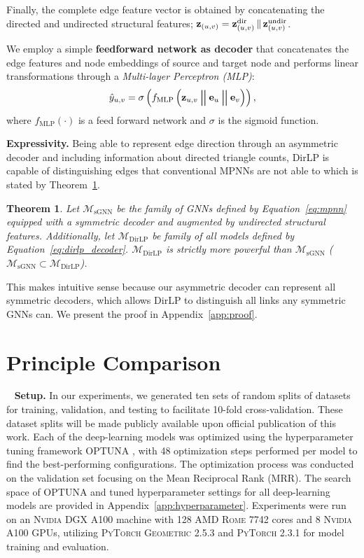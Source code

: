 \documentclass{article}
\newtheorem{theorem}{Theorem}
\DeclareMathOperator*{\concat}{\scalerel*{\Vert}{\sum}}
\begin{document}
Finally, the complete edge feature vector is obtained by concatenating the directed and undirected structural features; $\mathbf{z}_{(u, v)} = \mathbf{z}_{(u, v)}^{\operatorname{dir}} \concat \mathbf{z}_{(u, v)}^{\operatorname{undir}}$.
    
We employ a simple \textbf{feedforward network as decoder} that concatenates the edge features and node embeddings of source and target node and performs linear transformations through a \emph{Multi-layer Perceptron (MLP)}:
    \begin{equation}\label{eq:dirlp_decoder}
        \hat{y}_{u, v} = \sigma\left(f_{\operatorname{MLP}} \left(\mathbf{z}_{u, v} \concat \mathbf{e}_{u} \concat \mathbf{e}_{v} \right)\right), 
    \end{equation}
    where $f_{\operatorname{MLP}}(\cdot)$ is a feed forward network and $\sigma$ is the sigmoid function. 

\textbf{Expressivity.} Being able to represent edge direction through an asymmetric decoder and including information about directed triangle counts, DirLP is capable of distinguishing edges that conventional MPNNs are not able to which is stated by Theorem~\ref{thm:dirgnn}.

\begin{theorem}\label{thm:dirgnn}
    Let $\mathcal{M}_{\operatorname{sGNN}}$ be the family of GNNs defined by Equation~\ref{eq:mpnn} equipped with a symmetric decoder and augmented by undirected structural features. Additionally, let $\mathcal{M}_{\operatorname{DirLP}}$ be family of all models defined by Equation~\ref{eq:dirlp_decoder}. $\mathcal{M}_{\operatorname{DirLP}}$ is strictly more powerful than $\mathcal{M}_{\operatorname{sGNN}}$ ($\mathcal{M}_{\operatorname{sGNN}} \subset \mathcal{M}_{\operatorname{DirLP}}$).
\end{theorem}
This makes intuitive sense because our asymmetric decoder can represent all symmetric decoders, which allows DirLP to distinguish all links any symmetric GNNs can. We present the proof in Appendix~\ref{app:proof}.

\section{Principle Comparison}~\label{sec:experiments}
\textbf{Setup.} In our experiments, we generated ten sets of random splits of datasets for training, validation, and testing to facilitate 10-fold cross-validation. These dataset splits will be made publicly available upon official publication of this work. Each of the deep-learning models was optimized using the hyperparameter tuning framework \textsc{OPTUNA} \citep{akiba2019optuna}, with 48 optimization steps performed per model to find the best-performing configurations. The optimization process was conducted on the validation set focusing on the Mean Reciprocal Rank (MRR). The search space of \textsc{OPTUNA} and tuned hyperparameter settings for all deep-learning models are provided in Appendix~\ref{app:hyperparameter}. Experiments were run on an \textsc{Nvidia DGX A100} machine with 128 \textsc{AMD Rome 7742} cores and 8 \textsc{Nvidia A100} GPUs, utilizing \textsc{PyTorch Geometric 2.5.3} and \textsc{PyTorch 2.3.1} for model training and evaluation.
\end{document}
